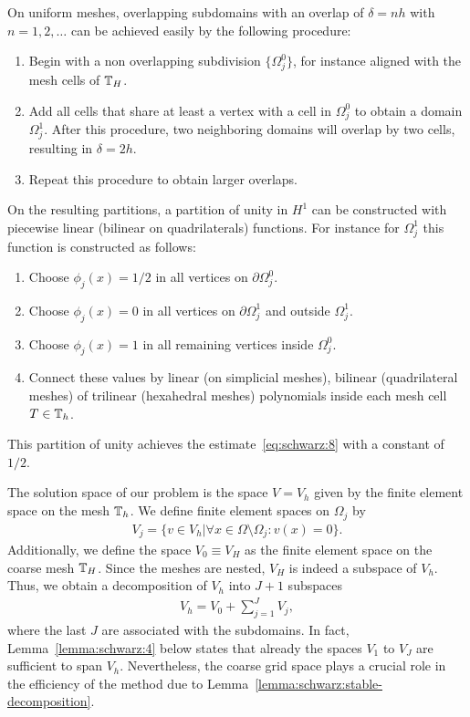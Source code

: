 \begin{example}
  \label{example:schwarz:2}
  On uniform meshes, overlapping subdomains with an overlap of
  $\delta = n h$ with $n=1,2,\ldots$ can be achieved easily by the
  following procedure:
  \begin{enumerate}
  \item Begin with a non overlapping subdivision $\{\Omega_j^0\}$,
    for instance aligned with the mesh cells of $\mathbb T_H$.
  \item Add all cells that share at least a vertex with a cell in
    $\Omega_j^0$ to obtain a domain $\Omega_j^1$. After this
    procedure, two neighboring domains will overlap by two cells,
    resulting in $\delta = 2h$.
  \item Repeat this procedure to obtain larger overlaps.
  \end{enumerate}
  
  On the resulting partitions, a partition of unity in $H^1$ can be
  constructed with piecewise linear (bilinear on quadrilaterals)
  functions. For instance for $\Omega_j^1$ this function is
  constructed as follows:
  \begin{enumerate}
  \item Choose $\phi_j(x) = 1/2$ in all vertices on $\partial \Omega_j^0$.
  \item Choose $\phi_j(x) = 0$ in all vertices on $\partial \Omega_j^1$ and outside
    $\Omega_j^1$.
  \item Choose $\phi_j(x) = 1$ in all remaining vertices inside
    $\Omega_j^0$.
    \item Connect these values by linear (on simplicial meshes), bilinear
      (quadrilateral meshes) of trilinear (hexahedral meshes)
      polynomials inside each mesh cell $T\in \mathbb T_h$.
  \end{enumerate}
  This partition of unity achieves the estimate~\eqref{eq:schwarz:8}
  with a constant of $1/2$.
\end{example}

\begin{notation}
  The solution space of our problem is the space $V=V_h$ given by the
  finite element space on the mesh $\mathbb T_h$. We define finite element
  spaces on $\Omega_j$ by
  \begin{gather}
    \label{eq:schwarz:9}
    V_j = \bigl\{ v\in V_h \big| \forall x\in\Omega\setminus\Omega_j :
    v(x) =0\bigr\}.
  \end{gather}
  Additionally, we define the space $V_0 \equiv V_H$ as the finite
  element space on the coarse mesh $\mathbb T_H$.  Since the meshes are
  nested, $V_H$ is indeed a subspace of $V_h$. Thus, we obtain a
  decomposition of $V_h$ into $J+1$ subspaces
  \begin{gather*}
    V_h = V_0 + \sum_{j=1}^J V_j,
  \end{gather*}
  where the last $J$ are associated with the subdomains. In fact,
  Lemma~\ref{lemma:schwarz:4} below states that already the spaces
  $V_1$ to $V_J$ are sufficient to span $V_h$. Nevertheless, the
  coarse grid space plays a crucial role in the efficiency of the
  method due to Lemma~\ref{lemma:schwarz:stable-decomposition}.
\end{notation}

